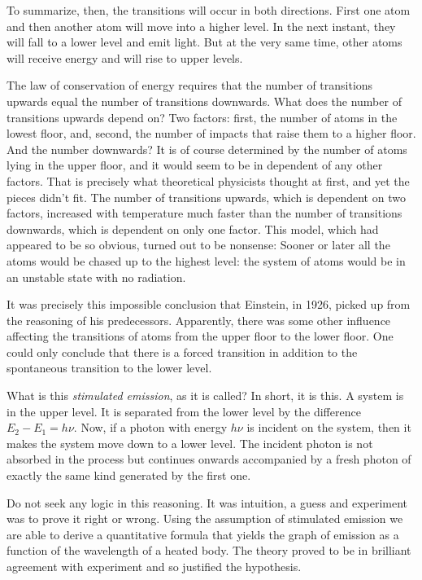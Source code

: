 To summarize, then, the transitions will occur in both directions. First one atom and then another atom will move into a higher level. In the next instant, they will fall to a lower level and emit light. But at the very same time, other atoms will receive energy and will rise to upper levels.

The law of conservation of energy requires that the number of transitions upwards equal the number of transitions downwards. What does the number of transitions upwards depend on? Two factors: first, the number of atoms in the lowest floor, and, second, the number of impacts that raise them to a higher floor. And the number downwards? It is of course determined by the number of atoms lying in the upper floor, and it would seem to be in dependent of any other factors. That is precisely what theoretical physicists thought at first, and yet the pieces didn’t fit. The number of transitions upwards, which is dependent on two factors, increased with temperature much faster than the number of transitions downwards, which is dependent on only one factor. This model, which had appeared to be so obvious, turned out to be nonsense: Sooner or later all the atoms would be chased up to the highest level: the system of atoms would be in an unstable state with no radiation.

It was precisely this impossible conclusion that Einstein, in 1926, picked up from the reasoning of his predecessors. Apparently, there was some other influence affecting the transitions of atoms from the upper floor to the lower floor. One could only conclude that there is a forced transition in addition to the spontaneous transition to the lower level.

What is this \emph{stimulated emission}, as it is called? In short, it is this. A system is in the upper level. It is separated from the lower level by the difference $E_{2} - E_{1}= h\nu$. Now, if a photon with energy $h\nu$ is incident on the system, then it makes the system move down to a lower level. The incident photon is not absorbed in the process but continues onwards accompanied by a fresh photon of exactly the same kind generated by the first one.

Do not seek any logic in this reasoning. It was intuition, a guess and experiment was to prove it right or wrong. Using the assumption of stimulated emission we are able to derive a quantitative formula that yields the graph of emission as a function of the wavelength of a heated body. The theory proved to be in brilliant agreement with experiment and so justified the hypothesis.

